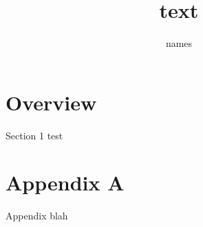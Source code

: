 \documentclass[compress]{beamer}
\author{names}
\title{text}
\begin{document}
\section{Overview}
\begin{frame}{Section 1}
    test
\end{frame}

{
      
}

\appendix
\section{Appendix A}
\begin{frame}[noframenumbering]
    Appendix blah
\end{frame}
\end{document}
